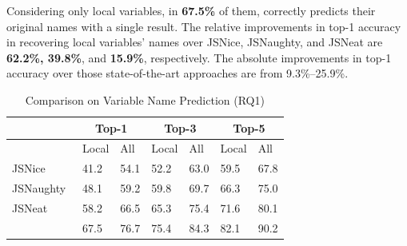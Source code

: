 Considering only local variables, in {\bf 67.5\%} of them, {\tool}
correctly predicts their original names with a single result. The
relative improvements in top-1 accuracy in recovering local variables'
names over JSNice, JSNaughty, and JSNeat are {\bf 62.2\%, 39.8\%}, and
{\bf 15.9\%}, respectively. The absolute improvements in top-1
accuracy over those state-of-the-art approaches are from 9.3\%--25.9\%.

\begin{table}[t]%
  \caption{Comparison on Variable Name Prediction (RQ1)}
  \vspace{-8pt}
	\begin{center}
		\small
		\renewcommand{\arraystretch}{1} \begin{tabular}{|p{1.9cm}<{\centering}|p{0.65cm}<{\centering}|p{0.65cm}<{\centering}|p{0.65cm}<{\centering}|p{0.65cm}<{\centering}|p{0.65cm}<{\centering}|p{0.65cm}<{\centering}|}
			
			\hline
                       & \multicolumn{2}{c|}{Top-1}         & \multicolumn{2}{c|}{Top-3}         & \multicolumn{2}{c|}{Top-5} \\
			\hline
                       & Local & All & Local & All & Local & All  \\ 
			\hline
		        JSNice~\cite{JSNice2015} &  41.2    & 54.1  & 52.2 &    63.0   & 59.5      &   67.8    \\
			JSNaughty~\cite{JSNaughty2017}  &   48.1   &  59.2    &  59.8    &  69.7    &  66.3    &   75.0    \\
			JSNeat~\cite{icse19}  &   58.2   &  66.5    &  65.3    & 75.4     &  71.6    & 80.1     \\
			\hline
			{\bf {\tool}} & 67.5 & 76.7 & 75.4 & 84.3 & 82.1 & 90.2 \\
			\hline
		\end{tabular}
		\label{name-result}
	\end{center}
\end{table}

